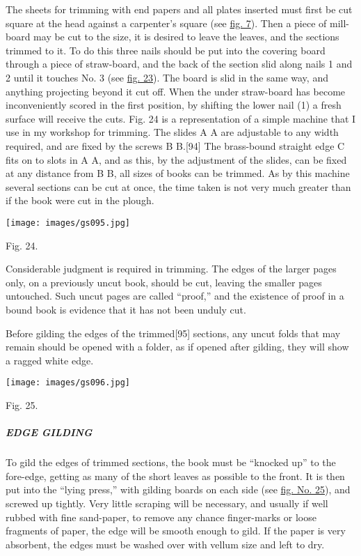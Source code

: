\documentclass[
]{article}
\begin{document}
The sheets for trimming with end papers and all plates inserted must
first be cut square at the head against a carpenter's square (see
\protect\hyperlink{Fig_7}{fig. 7}). Then a piece of mill-board may be
cut to the size, it is desired to leave the leaves, and the sections
trimmed to it. To do this three nails should be put into the covering
board through a piece of straw-board, and the back of the section slid
along nails 1 and 2 until it touches No. 3 (see
\protect\hyperlink{Fig_23}{fig. 23}). The board is slid in the same way,
and anything projecting beyond it cut off. When the under straw-board
has become inconveniently scored in the first position, by shifting the
lower nail (1) a fresh surface will receive the cuts. Fig. 24 is a
representation of a simple machine that I use in my workshop for
trimming. The slides A A are adjustable to any width required, and are
fixed by the screws B B.{\protect\hypertarget{Page_94}{}{{[}94{]}}} The
brass-bound straight edge C fits on to slots in A A, and as this, by the
adjustment of the slides, can be fixed at any distance from B B, all
sizes of books can be trimmed. As by this machine several sections can
be cut at once, the time taken is not very much greater than if the book
were cut in the plough.

\texttt{[image: images/gs095.jpg]}

Fig. 24.

Considerable judgment is required in trimming. The edges of the larger
pages only, on a previously uncut book, should be cut, leaving the
smaller pages untouched. Such uncut pages are called ``proof,'' and the
existence of proof in a bound book is evidence that it has not been
unduly cut.

Before gilding the edges of the
trimmed{\protect\hypertarget{Page_95}{}{{[}95{]}}} sections, any uncut
folds that may remain should be opened with a folder, as if opened after
gilding, they will show a ragged white edge.

\protect\hypertarget{Fig_25}{}{}
\texttt{[image: images/gs096.jpg]}

Fig. 25.

\hypertarget{edge-gilding}{%
\subparagraph{EDGE GILDING}\label{edge-gilding}}

To gild the edges of trimmed sections, the book must be ``knocked up''
to the fore-edge, getting as many of the short leaves as possible to the
front. It is then put into the ``lying press,'' with gilding boards on
each side (see \protect\hyperlink{Fig_25}{fig. No. 25}), and screwed up
tightly. Very little scraping will be necessary, and usually if well
rubbed with fine sand-paper, to remove any chance finger-marks or loose
fragments of paper, the edge will be smooth enough to gild. If the paper
is very absorbent, the edges must be washed over with vellum size and
left to dry.
\end{document}
